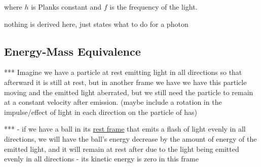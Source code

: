 where $h$ is Planks constant and $f$ is the frequency of the light.

nothing is derived here, just states what to do for a photon

\subsection{Energy-Mass Equivalence}

*** Imagine we have a particle at rest emitting light in all directions so that afterward it is still at rest, but in another frame we have we have this particle moving and the emitted light aberrated, but we still need the particle to remain at a constant velocity after emission.
(maybe include a rotation in the impulse/effect of light in each direction on the particle of has)

*** - if we have a ball in its \hyperlink{def-pr oper-frame}{rest frame} that emits a flash of light evenly in all directions, we will have the ball's energy decrease by the amount of energy of the emitted light, and it will remain at rest after due to the light being emitted evenly in all directions
- its kinetic energy is zero in this frame







